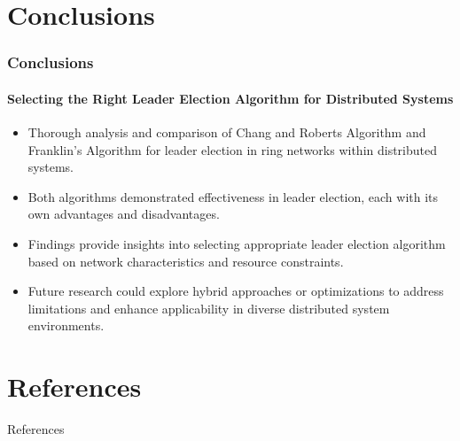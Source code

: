 \documentclass[11pt]{beamer}              %
\begin{document}
\section{Conclusions}
\begin{frame}
\frametitle{Conclusions}
\framesubtitle{Selecting the Right Leader Election Algorithm for Distributed Systems}
\begin{itemize}
    \item Thorough analysis and comparison of Chang and Roberts Algorithm and Franklin’s Algorithm for leader election in ring networks within distributed systems.
    \item Both algorithms demonstrated effectiveness in leader election, each with its own advantages and disadvantages.
    \item Findings provide insights into selecting appropriate leader election algorithm based on network characteristics and resource constraints.
    \item Future research could explore hybrid approaches or optimizations to address limitations and enhance applicability in diverse distributed system environments.
\end{itemize}

\end{frame}

\section*{References}
\begin{frame}{References}


\nocite{*} %
\end{frame}


\thankslide
\end{document}
